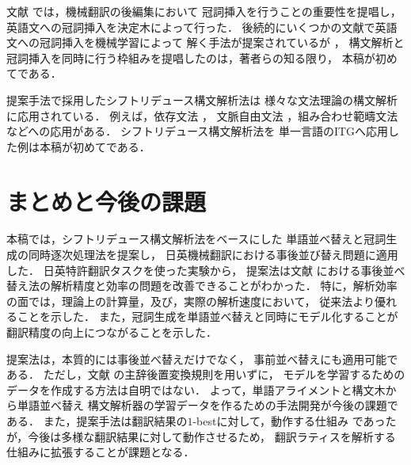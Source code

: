 \documentclass[japanese]{jnlp_1.4}
\begin{document}
文献 \cite{Knight:94}では，機械翻訳の後編集において
冠詞挿入を行うことの重要性を提唱し，
英語文への冠詞挿入を決定木によって行った．
後続的にいくつかの文献で英語文への冠詞挿入を機械学習によって
解く手法が提案されているが \cite{Minnen:00,Turner:07}，
構文解析と冠詞挿入を同時に行う枠組みを提唱したのは，著者らの知る限り，
本稿が初めてである．

提案手法で採用したシフトリデュース構文解析法は
様々な文法理論の構文解析に応用されている．
例えば，依存文法 \cite{Yamada:03,Nivre:03,Huang:10}，
文脈自由文法 \cite{Sagae:06}，組み合わせ範疇文法 \cite{Zhang:11}
などへの応用がある．
シフトリデュース構文解析法を
単一言語のITGへ応用した例は本稿が初めてである．


\section{まとめと今後の課題}

本稿では，シフトリデュース構文解析法をベースにした
単語並べ替えと冠詞生成の同時逐次処理法を提案し，
日英機械翻訳における事後並び替え問題に適用した．
日英特許翻訳タスクを使った実験から，
提案法は文献 \cite{Goto:12}
における事後並べ替え法の解析精度と効率の問題を改善できることがわかった．
特に，解析効率の面では，理論上の計算量，及び，実際の解析速度において，
従来法より優れることを示した．
また，冠詞生成を単語並べ替えと同時にモデル化することが
翻訳精度の向上につながることを示した．

提案法は，本質的には事後並べ替えだけでなく，
事前並べ替えにも適用可能である．
ただし，文献 \cite{Isozaki:12}の主辞後置変換規則を用いずに，
モデルを学習するためのデータを作成する方法は自明ではない．
よって，単語アライメントと構文木から単語並べ替え
構文解析器の学習データを作るための手法開発が今後の課題である．
また，提案手法は翻訳結果の$1$-bestに対して，動作する仕組み
であったが，今後は多様な翻訳結果に対して動作させるため，
翻訳ラティスを解析する仕組みに拡張することが課題となる．
\end{document}
